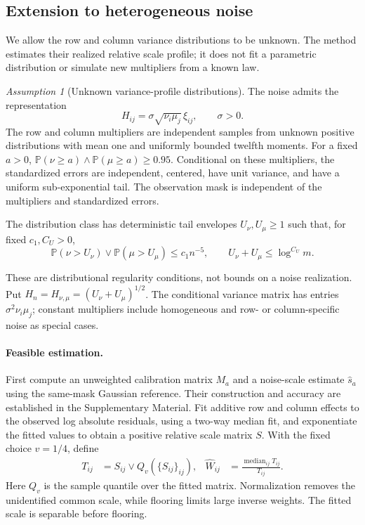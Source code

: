 \documentclass[numsec,webpdf,modern,large,namedate]{oup-authoring-template}
\theoremstyle{plain}
\theoremstyle{remark}
\newtheorem{assumption}{Assumption}
\newif\ifmarkchanges
\newenvironment{revision}{\begingroup\ifmarkchanges\color{red}\fi}{\endgroup}
\begin{document}
\begin{revision}
\subsection{Extension to heterogeneous noise}
\label{sec:4.4}

We allow the row and column variance distributions to be unknown. The
method estimates their realized relative scale profile; it does not fit
a parametric distribution or simulate new multipliers from a known law.

\begin{assumption}[Unknown variance-profile distributions]
\label{assum:hetero}
The noise admits the representation
\[
 H_{ij}=\sigma\sqrt{\nu_i\mu_j}\,\xi_{ij},\qquad \sigma>0.
\]
The row and column multipliers are independent samples from unknown
positive distributions with mean one and uniformly bounded twelfth
moments. For a fixed $a>0$,
$\mathbb P(\nu\ge a)\wedge\mathbb P(\mu\ge a)\ge0.95$.
Conditional on these multipliers, the standardized errors are
independent, centered, have unit variance, and have a uniform
sub-exponential tail. The observation mask is independent of the
multipliers and standardized errors.

The distribution class has deterministic tail envelopes
$U_\nu,U_\mu\ge1$ such that, for fixed $c_1,C_U>0$,
\[
 \mathbb P(\nu>U_\nu)\vee\mathbb P(\mu>U_\mu)\le c_1n^{-5},
 \qquad U_\nu+U_\mu\le\log^{C_U}m.
\]
\end{assumption}
These are distributional regularity conditions, not bounds on a noise
realization. Put $H_n=H_{\nu,\mu}=(U_\nu+U_\mu)^{1/2}$.
The conditional variance matrix has entries $\sigma^2\nu_i\mu_j$;
constant multipliers include homogeneous and row- or column-specific
noise as special cases.

\paragraph{Feasible estimation.}
First compute an unweighted calibration matrix $M_a$ and a noise-scale
estimate $\widehat s_a$ using the same-mask Gaussian reference. Their
construction and accuracy are established in the Supplementary Material.
Fit additive row and column effects to the observed log absolute
residuals, using a two-way median fit, and exponentiate the fitted values
to obtain a positive relative scale matrix $S$. With the fixed choice
$v=1/4$, define
\begin{align}
 T_{ij}&=S_{ij}\vee Q_v(\{S_{ij}\}_{ij}),&
 \widehat W_{ij}&=\frac{\operatorname{median}_{ij}T_{ij}}{T_{ij}}.
 \label{eq:normalized_truncated_weights}
\end{align}
Here $Q_v$ is the sample quantile over the fitted matrix. Normalization
removes the unidentified common scale, while flooring limits large
inverse weights. The fitted scale is separable before flooring.


\end{revision}
\end{document}
